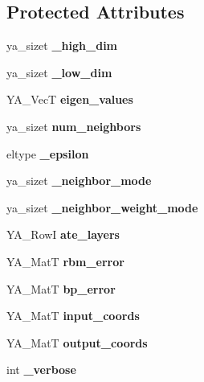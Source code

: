 \subsection*{Protected Attributes}
\begin{CompactItemize}
\item 
\hypertarget{class_y_a_dim_reduce_p0}{
ya\_\-sizet {\bf \_\-high\_\-dim}}
\label{class_y_a_dim_reduce_p0}

\item 
\hypertarget{class_y_a_dim_reduce_p1}{
ya\_\-sizet {\bf \_\-low\_\-dim}}
\label{class_y_a_dim_reduce_p1}

\item 
\hypertarget{class_y_a_dim_reduce_p2}{
YA\_\-Vec\-T {\bf eigen\_\-values}}
\label{class_y_a_dim_reduce_p2}

\item 
\hypertarget{class_y_a_dim_reduce_p3}{
ya\_\-sizet {\bf num\_\-neighbors}}
\label{class_y_a_dim_reduce_p3}

\item 
\hypertarget{class_y_a_dim_reduce_p4}{
eltype {\bf \_\-epsilon}}
\label{class_y_a_dim_reduce_p4}

\item 
\hypertarget{class_y_a_dim_reduce_p5}{
ya\_\-sizet {\bf \_\-neighbor\_\-mode}}
\label{class_y_a_dim_reduce_p5}

\item 
\hypertarget{class_y_a_dim_reduce_p6}{
ya\_\-sizet {\bf \_\-neighbor\_\-weight\_\-mode}}
\label{class_y_a_dim_reduce_p6}

\item 
\hypertarget{class_y_a_dim_reduce_p7}{
YA\_\-Row\-I {\bf ate\_\-layers}}
\label{class_y_a_dim_reduce_p7}

\item 
\hypertarget{class_y_a_dim_reduce_p8}{
YA\_\-Mat\-T {\bf rbm\_\-error}}
\label{class_y_a_dim_reduce_p8}

\item 
\hypertarget{class_y_a_dim_reduce_p9}{
YA\_\-Mat\-T {\bf bp\_\-error}}
\label{class_y_a_dim_reduce_p9}

\item 
\hypertarget{class_y_a_dim_reduce_p10}{
YA\_\-Mat\-T {\bf input\_\-coords}}
\label{class_y_a_dim_reduce_p10}

\item 
\hypertarget{class_y_a_dim_reduce_p11}{
YA\_\-Mat\-T {\bf output\_\-coords}}
\label{class_y_a_dim_reduce_p11}

\item 
\hypertarget{class_y_a_dim_reduce_p12}{
int {\bf \_\-verbose}}
\label{class_y_a_dim_reduce_p12}

\end{CompactItemize}


